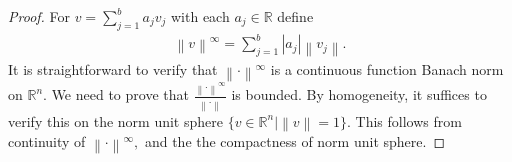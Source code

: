 \documentclass[10pt,a4paper]{amsart}
\newcommand{\R}{\mathbb{R}}
\newcommand{\no}[1]{\left\lVert#1\right\rVert}
\begin{document}
	\begin{proof}
	For $v=\sum_{j=1}^b a_jv_j$ with each $a_j\in\R$ define
	\begin{align*}
		\no{v}^\infty=\sum_{j=1}^b|a_j|\no{v_j}.
	\end{align*}
	It is straightforward to verify that $\no{\cdot}^\infty$ is a continuous function Banach norm on $\R^n$. We need to prove that $\frac{\no{\cdot}^\infty}{\no{\cdot}}$ is bounded. By homogeneity, it suffices to verify this on the norm unit sphere $\{v\in \R^n|\no{v}=1\}.$ This follows from continuity of $\no{\cdot}^\infty,$ and the the compactness of norm unit sphere.
	\end{proof}
\end{document}

